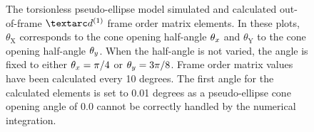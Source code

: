 \begin{figure}
\begin{tabular}{@{}cc@{}}
  \end{tabular}
  \caption[Torsionless pseudo-ellipse simulated and calculated out-of-frame $\FOone$ elements.]{
    The torsionless pseudo-ellipse model simulated and calculated out-of-frame $\FOone$ frame order matrix elements.
    In these plots, $\theta_\textrm{X}$ corresponds to the cone opening half-angle $\theta_x$ and $\theta_\textrm{Y}$ to the cone opening half-angle $\theta_y$.
    When the half-angle is not varied, the angle is fixed to either $\theta_x = \pi/4$ or $\theta_y = 3\pi/8$.
    Frame order matrix values have been calculated every 10 degrees.
    The first angle for the calculated elements is set to 0.01 degrees as a pseudo-ellipse cone opening angle of 0.0 cannot be correctly handled by the numerical integration.
  }
  \label{fig: simulated and calculated out-of-frame 1st degree pseudo-ellipse, torsionless frame order}
\end{figure}

